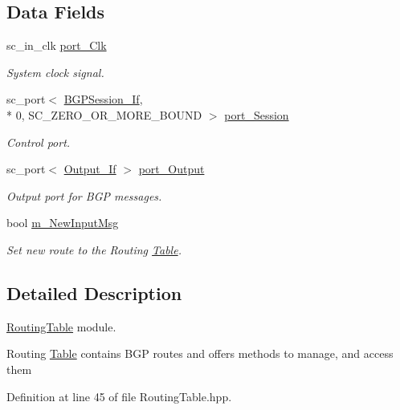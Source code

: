 \subsection*{Data Fields}
\begin{DoxyCompactItemize}
\item 
sc\-\_\-in\-\_\-clk \hyperlink{classRoutingTable_a3f57617a0dbdfabc34534eda6731da74}{port\-\_\-\-Clk}
\begin{DoxyCompactList}\small\item\em System clock signal. \end{DoxyCompactList}\item 
sc\-\_\-port$<$ \hyperlink{classBGPSession__If}{B\-G\-P\-Session\-\_\-\-If}, \\*
0, S\-C\-\_\-\-Z\-E\-R\-O\-\_\-\-O\-R\-\_\-\-M\-O\-R\-E\-\_\-\-B\-O\-U\-N\-D $>$ \hyperlink{classRoutingTable_af24047fc955ca1e81caee0468f70f62c}{port\-\_\-\-Session}
\begin{DoxyCompactList}\small\item\em Control port. \end{DoxyCompactList}\item 
sc\-\_\-port$<$ \hyperlink{classOutput__If}{Output\-\_\-\-If} $>$ \hyperlink{classRoutingTable_ac463a755c9a322a1641ae0422ee845e3}{port\-\_\-\-Output}
\begin{DoxyCompactList}\small\item\em Output port for B\-G\-P messages. \end{DoxyCompactList}\item 
bool \hyperlink{classRoutingTable_a4a4945747e35355545c416e5965b83bc}{m\-\_\-\-New\-Input\-Msg}
\begin{DoxyCompactList}\small\item\em Set new route to the Routing \hyperlink{classTable}{Table}. \end{DoxyCompactList}\end{DoxyCompactItemize}


\subsection{Detailed Description}
\hyperlink{classRoutingTable}{Routing\-Table} module. 

Routing \hyperlink{classTable}{Table} contains B\-G\-P routes and offers methods to manage, and access them 

Definition at line 45 of file Routing\-Table.\-hpp.



